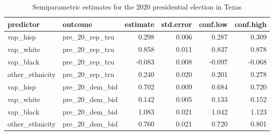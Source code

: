 \begin{table}[ht]
\centering
\begin{tabular}{llrrrr}
  \hline
predictor & outcome & estimate & std.error & conf.low & conf.high \\ 
  \hline
vap\_hisp & pre\_20\_rep\_tru & 0.298 & 0.006 & 0.287 & 0.309 \\ 
  vap\_white & pre\_20\_rep\_tru & 0.858 & 0.011 & 0.837 & 0.878 \\ 
  vap\_black & pre\_20\_rep\_tru & -0.083 & 0.008 & -0.097 & -0.068 \\ 
  other\_ethnicity & pre\_20\_rep\_tru & 0.240 & 0.020 & 0.201 & 0.278 \\ 
  vap\_hisp & pre\_20\_dem\_bid & 0.702 & 0.009 & 0.684 & 0.720 \\ 
  vap\_white & pre\_20\_dem\_bid & 0.142 & 0.005 & 0.133 & 0.152 \\ 
  vap\_black & pre\_20\_dem\_bid & 1.083 & 0.021 & 1.042 & 1.123 \\ 
  other\_ethnicity & pre\_20\_dem\_bid & 0.760 & 0.021 & 0.720 & 0.801 \\ 
   \hline
\end{tabular}
\caption{Semiparametric estimates for the 2020 presidential election in Texas} 
\label{tab:ei-estimates-texas}
\end{table}
